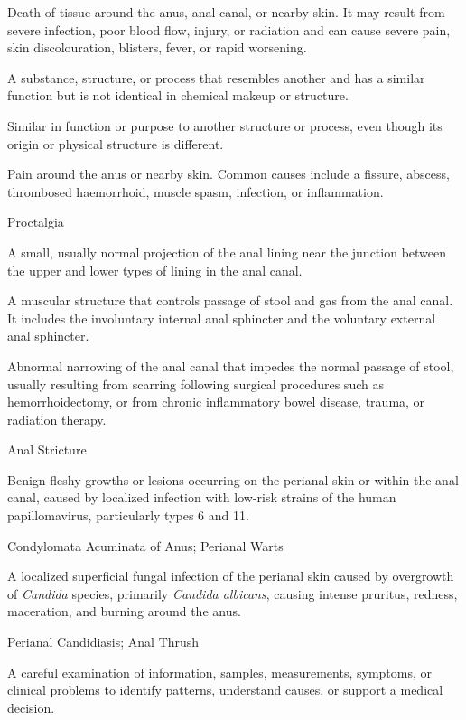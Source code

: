  Death of tissue around the anus, anal canal, or nearby skin. It may result from severe infection, poor blood flow, injury, or radiation and can cause severe pain, skin discolouration, blisters, fever, or rapid worsening.

 A substance, structure, or process that resembles another and has a similar function but is not identical in chemical makeup or structure.

 Similar in function or purpose to another structure or process, even though its origin or physical structure is different.

 Pain around the anus or nearby skin. Common causes include a fissure, abscess, thrombosed haemorrhoid, muscle spasm, infection, or inflammation.

\synonyms
Proctalgia

 A small, usually normal projection of the anal lining near the junction between the upper and lower types of lining in the anal canal.

 A muscular structure that controls passage of stool and gas from the anal canal. It includes the involuntary internal anal sphincter and the voluntary external anal sphincter.

 Abnormal narrowing of the anal canal that impedes the normal passage of stool, usually resulting from scarring following surgical procedures such as hemorrhoidectomy, or from chronic inflammatory bowel disease, trauma, or radiation therapy.

\synonyms
Anal Stricture

 Benign fleshy growths or lesions occurring on the perianal skin or within the anal canal, caused by localized infection with low-risk strains of the human papillomavirus, particularly types 6 and 11.

\synonyms
Condylomata Acuminata of Anus; Perianal Warts

 A localized superficial fungal infection of the perianal skin caused by overgrowth of \textit{Candida} species, primarily \textit{Candida albicans}, causing intense pruritus, redness, maceration, and burning around the anus.

\synonyms
Perianal Candidiasis; Anal Thrush

 A careful examination of information, samples, measurements, symptoms, or clinical problems to identify patterns, understand causes, or support a medical decision.

